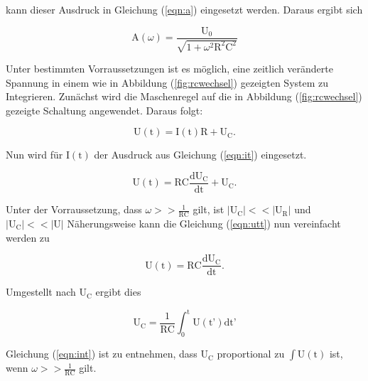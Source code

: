 \noindent
kann dieser Ausdruck in Gleichung (\ref{eqn:a}) eingesetzt werden. Daraus ergibt sich 

\begin{equation}
\text{A}(\omega) = \frac{\text{U}_0}{\sqrt{1 + \omega^2 \text{R}^2 \text{C}^2 }}
\label{eqn:sqrt}
\end{equation}

\noindent
Unter bestimmten Vorraussetzungen ist es möglich, eine zeitlich veränderte Spannung in einem wie in Abbildung (\ref{fig:rcwechsel}) gezeigten System zu Integrieren.
Zunächst wird die Maschenregel auf die in Abbildung (\ref{fig:rcwechsel}) gezeigte Schaltung angewendet. Daraus folgt:

\begin{equation}
\text{U}(\text{t}) = \text{I}(\text{t})\text{R} + \text{U}_\text{C}.
\end{equation}

\noindent
Nun wird für $\text{I}(\text{t})$ der Ausdruck aus Gleichung (\ref{eqn:it}) eingesetzt.

\begin{equation}
\text{U}(\text{t}) = \text{RC} \frac{\text{dU}_\text{C}}{\text{dt}} + \text{U}_\text{C}.
\label{eqn:utt}
\end{equation}

\noindent
Unter der Vorraussetzung, dass $\omega >> \frac{1}{\text{RC}}$ gilt, ist $|\text{U}_\text{C}| << |\text{U}_\text{R}|$ und  $|\text{U}_\text{C}| << |\text{U}|$
Näherungsweise kann die Gleichung (\ref{eqn:utt}) nun vereinfacht werden zu

\begin{equation}
\text{U}(\text{t}) = \text{RC} \frac{\text{dU}_\text{C}}{\text{dt}}.
\end{equation}

\noindent
Umgestellt nach $\text{U}_\text{C}$ ergibt dies

\begin{equation}
\text{U}_\text{C} = \frac{1}{\text{RC}} \int_0^\text{t} \text{U}(\text{t'}) \text{dt'}
\label{eqn:int}
\end{equation}

\noindent
Gleichung (\ref{eqn:int}) ist zu entnehmen, dass $\text{U}_\text{C}$ proportional zu $\int \text{U}(\text{t})$ ist, wenn $\omega >> \frac{1}{\text{RC}}$ gilt.
